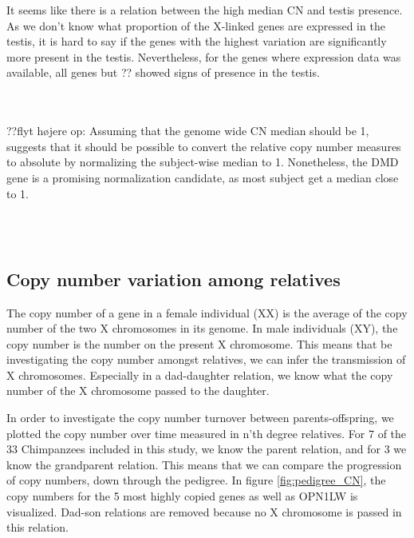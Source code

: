 


\noindent It seems like there is a relation between the high median CN and testis presence. As we don't know what proportion of the X-linked genes are expressed in the testis, it is hard to say if the genes with the highest variation are significantly more present in the testis. Nevertheless, for the genes where expression data was available, all genes but ?? showed signs of presence in the testis.




\\
\\
\noindent ??flyt højere op: Assuming that the genome wide CN median should be 1, suggests that it should be possible to convert the relative copy number measures to absolute by normalizing the subject-wise median to 1. Nonetheless, the DMD gene is a promising normalization candidate, as most subject get a median close to 1.

\\
\\
\subsection*{Copy number variation among relatives}
The copy number of a gene in a female individual (XX) is the average of the copy number of the two X chromosomes in its genome. In male individuals (XY), the copy number is the number on the present X chromosome. This means that be investigating the copy number amongst relatives, we can infer the transmission of X chromosomes. Especially in a dad-daughter relation, we know what the copy number of the X chromosome passed to the daughter.

In order to investigate the copy number turnover between parents-offspring, we plotted the copy number over time measured in n'th degree relatives. For 7 of the 33 Chimpanzees included in this study, we know the parent relation, and for 3 we know the grandparent relation. This means that we can compare the progression of copy numbers, down through the pedigree. In figure \ref{fig:pedigree_CN}, the copy numbers for the 5 most highly copied genes as well as OPN1LW is visualized. Dad-son relations are removed because no X chromosome is passed in this relation.

